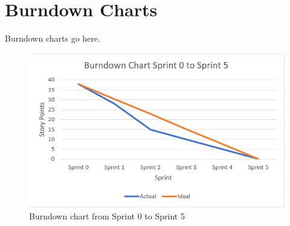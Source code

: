 \documentclass[conference]{IEEEtran}
\begin{document}


\section{Burndown Charts}
Burndown charts go here.

\begin{figure}
\begin{center}
\includegraphics[scale=0.75]{Burndown.png}
\caption{Burndown chart from Sprint 0 to Sprint 5}
\end{center}
\end{figure}



\end{document}
